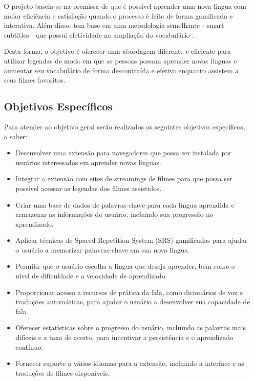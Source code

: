 \documentclass[12pt]{article}
\begin{document}
O projeto baseia-se na premissa de que é possível aprender uma nova língua com maior eficiência e satisfação quando o processo é feito de forma gamificada e interativa. Além disso, tem base em uma metodologia semelhante - smart subtitles - que possui efetividade na ampliação do vocabulário \cite{Kovacs14}. 

Desta forma, o objetivo é oferecer uma abordagem diferente e eficiente para utilizar legendas de modo em que as pessoas possam aprender novas línguas e aumentar seu vocabulário de forma descontraída e efetiva enquanto assistem a seus filmes favoritos.

\subsection{Objetivos Específicos}
Para atender ao objetivo geral serão realizados os seguintes objetivos específicos, a saber:
\begin{itemize}
\item Desenvolver uma extensão para navegadores que possa ser instalada por usuários interessados em aprender novas línguas.
\item Integrar a extensão com sites de streamings de filmes para que possa ser possível acessar as legendas dos filmes assistidos.
\item Criar uma base de dados de palavras-chave para cada língua aprendida e armazenar as informações do usuário, incluindo sua progressão no aprendizado.
\item Aplicar técnicas de Spaced Repetition System (SRS) gamificadas para ajudar o usuário a memorizar palavras-chave em sua nova língua.
\item Permitir que o usuário escolha a língua que deseja aprender, bem como o nível de dificuldade e a velocidade de aprendizado.
\item Proporcionar acesso a recursos de prática da fala, como dicionários de voz e traduções automáticas, para ajudar o usuário a desenvolver sua capacidade de fala.
\item Oferecer estatísticas sobre o progresso do usuário, incluindo as palavras mais difíceis e a taxa de acerto, para incentivar a persistência e o aprendizado contínuo.
\item Fornecer suporte a vários idiomas para a extensão, incluindo a interface e as traduções de filmes disponíveis.
\end{itemize}
\end{document}
